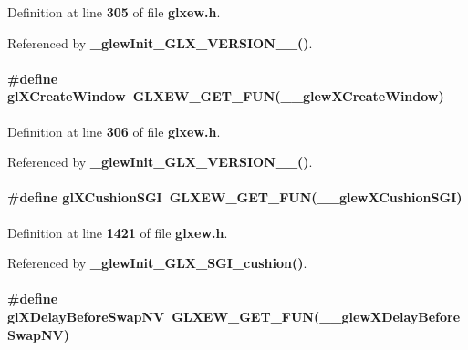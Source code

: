 Definition at line {\bf 305} of file {\bf glxew.\+h}.



Referenced by {\bf \+\_\+glew\+Init\+\_\+\+G\+L\+X\+\_\+\+V\+E\+R\+S\+I\+O\+N\+\_\+\_()}.

\paragraph[{gl\+X\+Create\+Window}]{\setlength{\rightskip}{0pt plus 5cm}\#define gl\+X\+Create\+Window~{\bf G\+L\+X\+E\+W\+\_\+\+G\+E\+T\+\_\+\+F\+UN}({\bf \+\_\+\+\_\+glew\+X\+Create\+Window})}\label{glxew_8h_af69090351b578fddce1a2938c214d40d}


Definition at line {\bf 306} of file {\bf glxew.\+h}.



Referenced by {\bf \+\_\+glew\+Init\+\_\+\+G\+L\+X\+\_\+\+V\+E\+R\+S\+I\+O\+N\+\_\+\_()}.

\paragraph[{gl\+X\+Cushion\+S\+GI}]{\setlength{\rightskip}{0pt plus 5cm}\#define gl\+X\+Cushion\+S\+GI~{\bf G\+L\+X\+E\+W\+\_\+\+G\+E\+T\+\_\+\+F\+UN}({\bf \+\_\+\+\_\+glew\+X\+Cushion\+S\+GI})}\label{glxew_8h_aac6dd7ba35d4c8f401ccce57da38f40f}


Definition at line {\bf 1421} of file {\bf glxew.\+h}.



Referenced by {\bf \+\_\+glew\+Init\+\_\+\+G\+L\+X\+\_\+\+S\+G\+I\+\_\+cushion()}.

\paragraph[{gl\+X\+Delay\+Before\+Swap\+NV}]{\setlength{\rightskip}{0pt plus 5cm}\#define gl\+X\+Delay\+Before\+Swap\+NV~{\bf G\+L\+X\+E\+W\+\_\+\+G\+E\+T\+\_\+\+F\+UN}({\bf \+\_\+\+\_\+glew\+X\+Delay\+Before\+Swap\+NV})}\label{glxew_8h_a4a81fa0489ec0f86b0ed5620dc3044fa}


